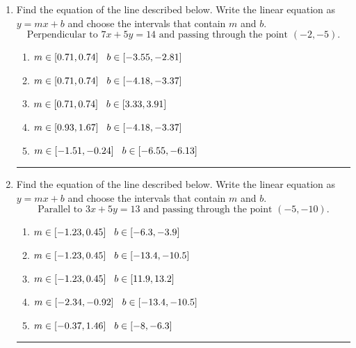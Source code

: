 \documentclass[14pt]{extbook}
\newcommand{\litem}[1]{\item#1\hspace*{-1cm}\rule{\textwidth}{0.4pt}}
\begin{document}
\begin{enumerate}
{\begin{enumerate}[label=\Alph*.]
\end{enumerate} }
\litem{
Find the equation of the line described below. Write the linear equation as $ y=mx+b $ and choose the intervals that contain $m$ and $b$.\[ \text{Perpendicular to } 7 x + 5 y = 14 \text{ and passing through the point } (-2, -5). \]\begin{enumerate}[label=\Alph*.]
\item \( m \in [0.71, 0.74] \hspace*{3mm} b \in [-3.55, -2.81] \)
\item \( m \in [0.71, 0.74] \hspace*{3mm} b \in [-4.18, -3.37] \)
\item \( m \in [0.71, 0.74] \hspace*{3mm} b \in [3.33, 3.91] \)
\item \( m \in [0.93, 1.67] \hspace*{3mm} b \in [-4.18, -3.37] \)
\item \( m \in [-1.51, -0.24] \hspace*{3mm} b \in [-6.55, -6.13] \)

\end{enumerate} }
\litem{
Find the equation of the line described below. Write the linear equation as $ y=mx+b $ and choose the intervals that contain $m$ and $b$.\[ \text{Parallel to } 3 x + 5 y = 13 \text{ and passing through the point } (-5, -10). \]\begin{enumerate}[label=\Alph*.]
\item \( m \in [-1.23, 0.45] \hspace*{3mm} b \in [-6.3, -3.9] \)
\item \( m \in [-1.23, 0.45] \hspace*{3mm} b \in [-13.4, -10.5] \)
\item \( m \in [-1.23, 0.45] \hspace*{3mm} b \in [11.9, 13.2] \)
\item \( m \in [-2.34, -0.92] \hspace*{3mm} b \in [-13.4, -10.5] \)
\item \( m \in [-0.37, 1.46] \hspace*{3mm} b \in [-8, -6.3] \)


\end{enumerate}}
\end{enumerate}
\end{document}

